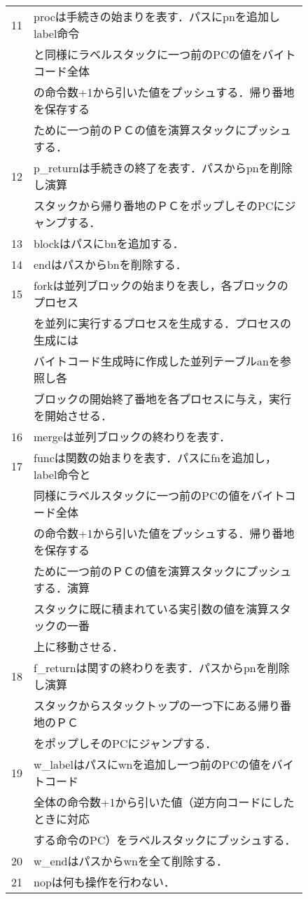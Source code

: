 \documentclass[submit,PRO]{ipsj}
\begin{document}
\begin{figure}[tb]
\begin{center}
\begin{tabular}[t]{|c|l|}
11& procは手続きの始まりを表す．パスにpnを追加しlabel命令\\ &と同様にラベルスタックに一つ前のPCの値をバイトコード全体\\ &の命令数+1から引いた値をプッシュする．帰り番地を保存する\\ &ために一つ前のＰＣの値を演算スタックにプッシュする．\\\hline

12& p\_returnは手続きの終了を表す．パスからpnを削除し演算\\ &スタックから帰り番地のＰＣをポップしそのPCにジャンプする．\\\hline

13& blockはパスにbnを追加する．\\\hline

14& endはパスからbnを削除する．\\\hline


15& forkは並列ブロックの始まりを表し，各ブロックのプロセス\\ &を並列に実行するプロセスを生成する．プロセスの生成には\\ &バイトコード生成時に作成した並列テーブルanを参照し各\\ &ブロックの開始終了番地を各プロセスに与え，実行を開始させる．\\\hline


16& mergeは並列ブロックの終わりを表す．\\\hline


17& funcは関数の始まりを表す．パスにfnを追加し，label命令と\\ &同様にラベルスタックに一つ前のPCの値をバイトコード全体\\ &の命令数+1から引いた値をプッシュする．帰り番地を保存する\\ &ために一つ前のＰＣの値を演算スタックにプッシュする．演算\\ &スタックに既に積まれている実引数の値を演算スタックの一番\\ &上に移動させる．\\\hline


18& f\_returnは関すの終わりを表す．パスからpnを削除し演算\\ &スタックからスタックトップの一つ下にある帰り番地のＰＣ\\ &をポップしそのPCにジャンプする．\\\hline


19& w\_labelはパスにwnを追加し一つ前のPCの値をバイトコード\\ &全体の命令数+1から引いた値（逆方向コードにしたときに対応\\ &する命令のPC）をラベルスタックにプッシュする．\\\hline

20& w\_endはパスからwnを全て削除する．\\\hline

21& nopは何も操作を行わない． \\\hline
\end{tabular}
\end{center}
\end{figure}
\end{document}
